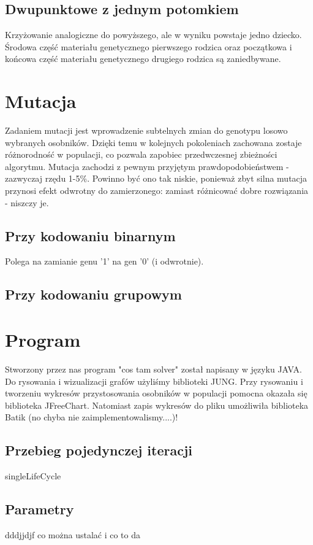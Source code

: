 \documentclass[11pt]{aghdpl}
\begin{document}
\section{Dwupunktowe z jednym potomkiem}
\label{sec:dwaJeden}
Krzyżowanie analogiczne do powyższego, ale w wyniku powstaje jedno dziecko. Środowa część materiału genetycznego pierwszego 
rodzica oraz początkowa i końcowa część materiału genetycznego drugiego rodzica są zaniedbywane.

\chapter{Mutacja}
\label{cha:mutation}
Zadaniem mutacji jest wprowadzenie subtelnych zmian do genotypu losowo wybranych osobników. Dzięki temu w kolejnych pokoleniach 
zachowana zostaje różnorodność w populacji, co pozwala zapobiec przedwczesnej zbieżności algorytmu. Mutacja zachodzi z 
pewnym przyjętym prawdopodobieństwem - zazwyczaj rzędu 1-5\%. Powinno być ono tak niskie, ponieważ zbyt silna mutacja przynosi 
efekt odwrotny do zamierzonego: zamiast różnicować dobre rozwiązania - niszczy je.

\section{Przy kodowaniu binarnym}
\label{sec:kodBin}
Polega na zamianie genu '1' na gen '0' (i odwrotnie).
\section{Przy kodowaniu grupowym}
\label{sec:kodGru}

\chapter{Program}
\label{cha:program}
Stworzony przez nas program "cos tam solver" został napisany w języku JAVA. Do rysowania i wizualizacji grafów użyliśmy biblioteki 
JUNG. Przy rysowaniu i tworzeniu wykresów przystosowania osobników w populacji pomocna okazała się biblioteka JFreeChart. Natomiast 
zapis wykresów do pliku umożliwiła biblioteka Batik (no chyba nie zaimplementowalismy....)!
\section{Przebieg pojedynczej iteracji}
\label{sec:singleLifeCycle}
singleLifeCycle
\section{Parametry}
\label{sec:params}
dddjjdjf
co można ustalać i co to da
\end{document}
